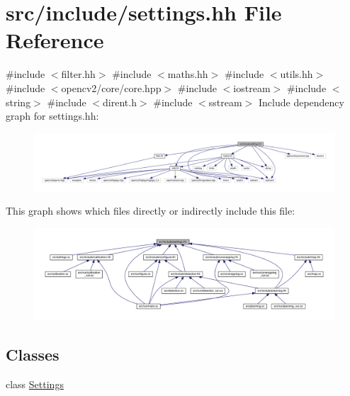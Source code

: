 \hypertarget{settings_8hh}{}\section{src/include/settings.hh File Reference}
\label{settings_8hh}
{\ttfamily \#include $<$filter.\+hh$>$}\newline
{\ttfamily \#include $<$maths.\+hh$>$}\newline
{\ttfamily \#include $<$utils.\+hh$>$}\newline
{\ttfamily \#include $<$opencv2/core/core.\+hpp$>$}\newline
{\ttfamily \#include $<$iostream$>$}\newline
{\ttfamily \#include $<$string$>$}\newline
{\ttfamily \#include $<$dirent.\+h$>$}\newline
{\ttfamily \#include $<$sstream$>$}\newline
Include dependency graph for settings.\+hh\+:
\nopagebreak
\begin{figure}[H]
\begin{center}
\leavevmode
\includegraphics[width=350pt]{settings_8hh__incl}
\end{center}
\end{figure}
This graph shows which files directly or indirectly include this file\+:
\nopagebreak
\begin{figure}[H]
\begin{center}
\leavevmode
\includegraphics[width=350pt]{settings_8hh__dep__incl}
\end{center}
\end{figure}
\subsection*{Classes}
\begin{DoxyCompactItemize}
\item 
class \mbox{\hyperlink{class_settings}{Settings}}
\end{DoxyCompactItemize}
